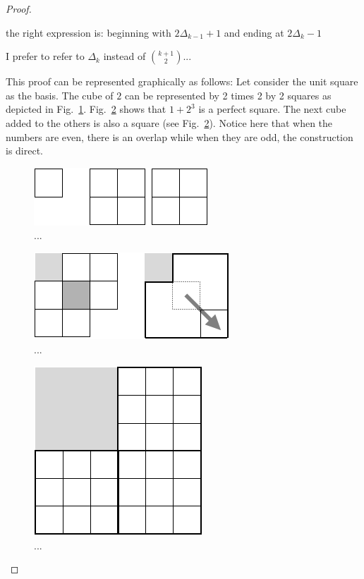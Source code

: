 \begin{proof}
\begin{description}
{\Denis the right expression is:
beginning with $2\Delta_{k-1} +1$ and ending at $2\Delta_k-1$}

{\Denis I prefer to refer to $\Delta_k$ instead of ${k+1 \choose 2} $... }

This proof can be represented graphically as follows:
Let consider the unit square as the basis.
The cube of $2$ can be represented by 2 times 2 by 2 squares as depicted in Fig.~\ref{fig:sumCubes1}.
Fig.~\ref{fig:sumCubes2} shows that $1+2^3$ is a perfect square.
The next cube added to the others is also a square (see Fig.~\ref{fig:sumCubes2}). 
Notice here that when the numbers are even, there is an overlap while when they are odd, the construction is direct.

\begin{figure}[h]
\begin{center}
       \includegraphics[scale=0.4]{FiguresMaths/SumCubes1}
\caption{...}
       \label{fig:sumCubes1}
\end{center}
\end{figure}

\begin{figure}[h]
\begin{center}
       \includegraphics[scale=0.4]{FiguresMaths/SumCubes2}
\caption{...}
       \label{fig:sumCubes2}
\end{center}
\end{figure}

\begin{figure}[h]
\begin{center}
       \includegraphics[scale=0.4]{FiguresMaths/SumCubes3}
\caption{...}
       \label{fig:sumCubes3}
\end{center}
\end{figure}



\end{description}
\end{proof}
